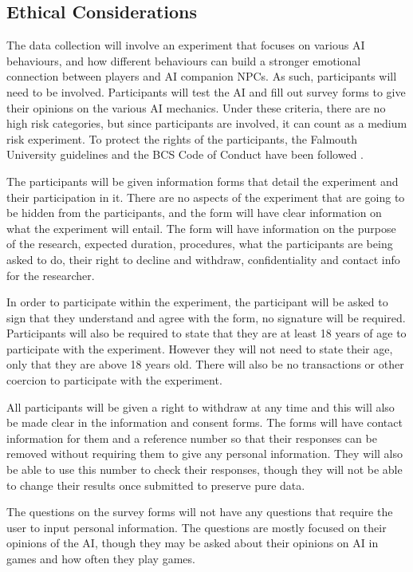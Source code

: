 \documentclass{IEEEtran}
\begin{document}
\subsection{Ethical Considerations}
\label{EthicalConsiderations}

The data collection will involve an experiment that focuses on various AI behaviours, and how different behaviours can build a stronger emotional connection between players and AI companion NPCs. As such, participants will need to be involved. Participants will test the AI and fill out survey forms to give their opinions on the various AI mechanics. Under these criteria, there are no high risk categories, but since participants are involved, it can count as a medium risk experiment. To protect the rights of the participants, the Falmouth University guidelines and the BCS Code of Conduct have been followed \cite{BCSConductCode}.

The participants will be given information forms that detail the experiment and their participation in it. There are no aspects of the experiment that are going to be hidden from the participants, and the form will have clear information on what the experiment will entail. The form will have information on the purpose of the research, expected duration, procedures, what the participants are being asked to do, their right to decline and withdraw, confidentiality and contact info for the researcher.

In order to participate within the experiment, the participant will be asked to sign that they understand and agree with the form, no signature will be required. Participants will also be required to state that they are at least 18 years of age to participate with the experiment. However they will not need to state their age, only that they are above 18 years old. There will also be no transactions or other coercion to participate with the experiment.

All participants will be given a right to withdraw at any time and this will also be made clear in the information and consent forms. The forms will have contact information for them and a reference number so that their responses can be removed without requiring them to give any personal information. They will also be able to use this number to check their responses, though they will not be able to change their results once submitted to preserve pure data.

The questions on the survey forms will not have any questions that require the user to input personal information. The questions are mostly focused on their opinions of the AI, though they may be asked about their opinions on AI in games and how often they play games.
\end{document}
